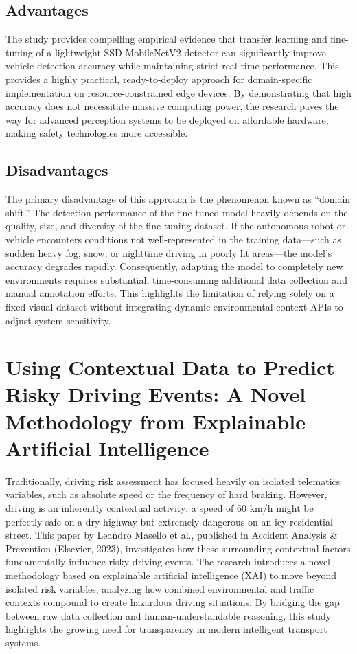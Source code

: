 \subsection{Advantages}
The study provides compelling empirical evidence that transfer learning and fine-tuning of a lightweight SSD MobileNetV2 detector can significantly improve vehicle detection accuracy while maintaining strict real-time performance. This provides a highly practical, ready-to-deploy approach for domain-specific implementation on resource-constrained edge devices. By demonstrating that high accuracy does not necessitate massive computing power, the research paves the way for advanced perception systems to be deployed on affordable hardware, making safety technologies more accessible.

\subsection{Disadvantages}
The primary disadvantage of this approach is the phenomenon known as ``domain shift.'' The detection performance of the fine-tuned model heavily depends on the quality, size, and diversity of the fine-tuning dataset. If the autonomous robot or vehicle encounters conditions not well-represented in the training data---such as sudden heavy fog, snow, or nighttime driving in poorly lit areas---the model's accuracy degrades rapidly. Consequently, adapting the model to completely new environments requires substantial, time-consuming additional data collection and manual annotation efforts. This highlights the limitation of relying solely on a fixed visual dataset without integrating dynamic environmental context APIs to adjust system sensitivity.

\section{Using Contextual Data to Predict Risky Driving Events: A Novel Methodology from Explainable Artificial Intelligence}

Traditionally, driving risk assessment has focused heavily on isolated telematics variables, such as absolute speed or the frequency of hard braking. However, driving is an inherently contextual activity; a speed of 60 km/h might be perfectly safe on a dry highway but extremely dangerous on an icy residential street. This paper by Leandro Masello et al., published in Accident Analysis \& Prevention (Elsevier, 2023), investigates how these surrounding contextual factors fundamentally influence risky driving events. The research introduces a novel methodology based on explainable artificial intelligence (XAI) to move beyond isolated risk variables, analyzing how combined environmental and traffic contexts compound to create hazardous driving situations. By bridging the gap between raw data collection and human-understandable reasoning, this study highlights the growing need for transparency in modern intelligent transport systems.

